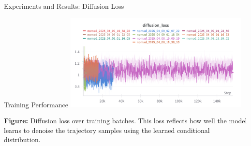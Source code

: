 \documentclass{beamer}
\begin{document}
    \begin{frame}{Experiments and Results: Diffusion Loss}
        \begin{block}{Training Performance}
            \centering
            \includegraphics[width=0.7\textwidth]{images/diffloss.png}
        
            \vspace{0.5em}
            \small
            \textbf{Figure:} Diffusion loss over training batches. This loss reflects how well the model learns to denoise the trajectory samples using the learned conditional distribution.
        \end{block}
    \end{frame}
\end{document}
